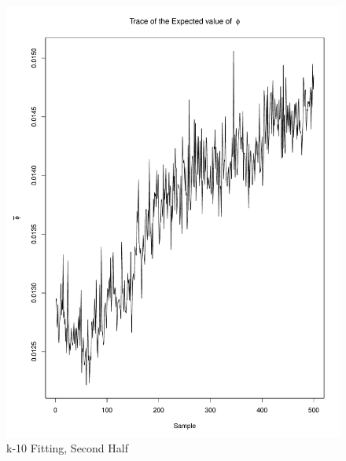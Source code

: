 \documentclass[11pt]{labbook}
\begin{document}
    \begin{figure}
        \centering
        \includegraphics[scale=.65]{FONSE_Plots/2016/December_14/k-10_expectedPhi_final}
        \caption{k-10 Fitting, Second Half}
        \label{fig:k-10_2EPHI}
    \end{figure}
\end{document}

